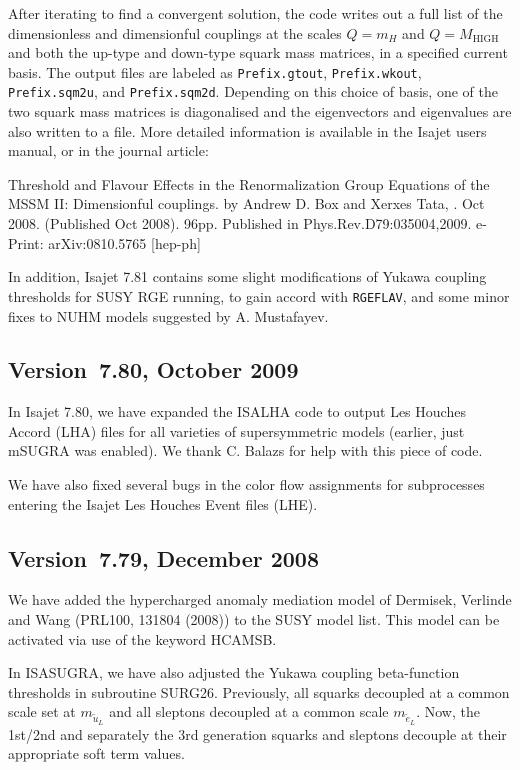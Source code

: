 After iterating to find a convergent solution, the code writes out a full list of the 
dimensionless and dimensionful couplings at the scales $Q=m_H$ and $Q=M_{\mathrm{HIGH}}$ 
and both the up-type and down-type squark mass matrices, in a specified current basis. 
The output files are labeled as \texttt{Prefix.gtout}, \texttt{Prefix.wkout}, 
\texttt{Prefix.sqm2u}, and \texttt{Prefix.sqm2d}.
Depending on this choice of basis, one of the two squark mass matrices is diagonalised 
and the eigenvectors and eigenvalues are also written to a file.
More detailed information is available in the Isajet users manual, or in the journal article:

Threshold and Flavour Effects in the Renormalization Group Equations of the MSSM II: Dimensionful couplings.
by Andrew D. Box and Xerxes Tata, . Oct 2008. (Published Oct 2008). 96pp.
Published in Phys.Rev.D79:035004,2009.
e-Print: arXiv:0810.5765 [hep-ph] 

In addition, Isajet 7.81 contains some slight modifications of Yukawa coupling thresholds
for SUSY RGE running, to gain accord with \texttt{RGEFLAV}, and some minor fixes
to NUHM models suggested by A. Mustafayev.

\subsection{Version~7.80, October 2009}

In Isajet 7.80, we have expanded the ISALHA code to output
Les Houches Accord (LHA) files for all varieties of supersymmetric 
models (earlier, just mSUGRA was enabled). We thank C. Balazs
for help with this piece of code. 

We have also fixed several bugs in the color flow assignments 
for subprocesses entering the Isajet Les Houches Event files (LHE). 


\subsection{Version~7.79, December 2008}

We have added the hypercharged anomaly mediation model of
Dermisek, Verlinde and Wang (PRL100, 131804 (2008)) to the SUSY
model list. This model can be activated via use of the keyword HCAMSB.

In ISASUGRA, we have also adjusted the Yukawa coupling beta-function thresholds
in subroutine SURG26. Previously, all squarks decoupled at a common scale
set at $m_{{\tilde u}_L}$ and all sleptons decoupled at a common scale
$m_{{\tilde e}_L}$. Now, the 1st/2nd and separately the 
3rd generation squarks and sleptons
decouple at their appropriate soft term values.

